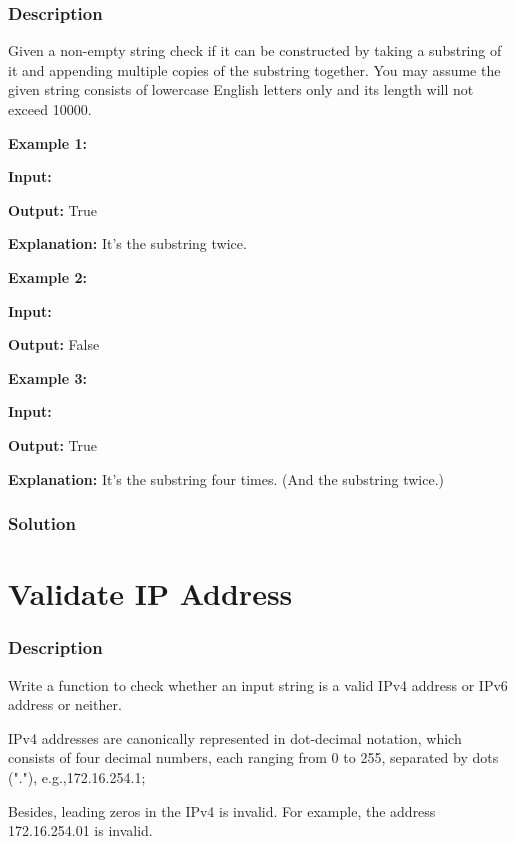 \subsubsection{Description}
Given a non-empty string check if it can be constructed by taking a substring of it and appending multiple copies of the substring together. You may assume the given string consists of lowercase English letters only and its length will not exceed 10000.

\textbf{Example 1:}

\textbf{Input:} 

\textbf{Output:} True

\textbf{Explanation:} It's the substring  twice.

\textbf{Example 2:}

\textbf{Input:} 

\textbf{Output:} False

\textbf{Example 3:}

\textbf{Input:} 

\textbf{Output:} True

\textbf{Explanation:} It's the substring  four times. (And the substring  twice.)
\subsubsection{Solution}

\begin{Code}

\end{Code}

\newpage

\section{Validate IP Address} %

\subsubsection{Description}
Write a function to check whether an input string is a valid IPv4 address or IPv6 address or neither.

IPv4 addresses are canonically represented in dot-decimal notation, which consists of four decimal numbers, each ranging from 0 to 255, separated by dots ("."), e.g.,172.16.254.1;

Besides, leading zeros in the IPv4 is invalid. For example, the address 172.16.254.01 is invalid.

